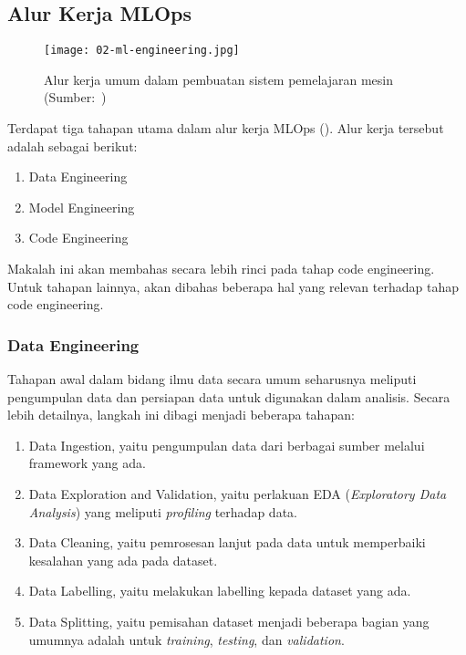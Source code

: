 \subsection{Alur Kerja MLOps}

\begin{figure}[h]
  \centering
  \texttt{[image: 02-ml-engineering.jpg]}
  \captionsetup{justification=centering}
  \caption{Alur kerja umum dalam pembuatan sistem pemelajaran mesin (Sumber:~\cite{mlopsorg})}
\end{figure}

Terdapat tiga tahapan utama dalam alur kerja MLOps (\cite{mlopsorg}).
Alur kerja tersebut adalah sebagai berikut:
\begin{enumerate}
  \item Data Engineering
  \item Model Engineering
  \item Code Engineering
\end{enumerate}

Makalah ini akan membahas secara lebih rinci pada tahap code engineering.
Untuk tahapan lainnya, akan dibahas beberapa hal yang relevan terhadap tahap code engineering.

\subsubsection{Data Engineering}

Tahapan awal dalam bidang ilmu data secara umum seharusnya meliputi pengumpulan data dan persiapan data untuk digunakan dalam analisis.
Secara lebih detailnya, langkah ini dibagi menjadi beberapa tahapan:
\begin{enumerate}
  \item Data Ingestion, yaitu pengumpulan data dari berbagai sumber melalui framework yang ada. 
  \item Data Exploration and Validation, yaitu perlakuan EDA (\textit{Exploratory Data Analysis}) yang meliputi \textit{profiling} terhadap data.
  \item Data Cleaning, yaitu pemrosesan lanjut pada data untuk memperbaiki kesalahan yang ada pada dataset.
  \item Data Labelling, yaitu melakukan labelling kepada dataset yang ada.
  \item Data Splitting, yaitu pemisahan dataset menjadi beberapa bagian yang umumnya adalah untuk \textit{training}, \textit{testing}, dan \textit{validation}.
\end{enumerate}

